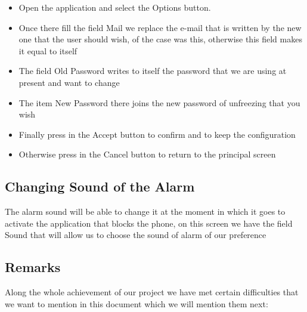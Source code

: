 \documentclass[12pt,letterpaper]{article}
\begin{document}
 \begin{itemize}

\item{Open the application and select the Options button.}
\item{Once there fill the field Mail we replace the e-mail that is written by the new one that the user should wish, of the case was this, otherwise this field makes it equal to itself }
\item{The field Old Password writes to itself the password that we are using at present and want to change}
\item{The item New Password there joins the new password of unfreezing that you wish}
\item{Finally press in the Accept button to confirm and to keep the configuration}
\item{Otherwise press in the Cancel button to return to the principal screen}


\end{itemize}


\subsection{Changing Sound of the Alarm}
The alarm sound will be able to change it at the moment in which it goes to activate the application that blocks the phone, on this screen we have the field Sound that will allow us to choose the sound of alarm of our preference

\subsection{Remarks}
  Along the whole achievement of our project we have met certain difficulties that we want to mention in this document which we will mention them next:
\end{document}
